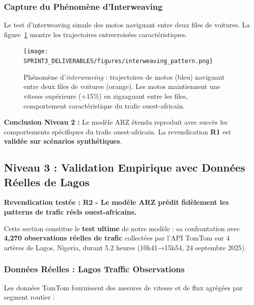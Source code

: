 \subsubsection{Capture du Phénomène d'Interweaving}
\label{subsec:validation_interweaving}

Le test d'interweaving simule des motos naviguant entre deux files de voitures. La figure~\ref{fig:interweaving_pattern} montre les trajectoires entrecroisées caractéristiques.

\begin{figure}[htbp]
    \centering
    \texttt{[image: SPRINT3\_DELIVERABLES/figures/interweaving\_pattern.png]}
    \caption{Phénomène d'\textit{interweaving} : trajectoires de motos (bleu) naviguant entre deux files de voitures (orange). Les motos maintiennent une vitesse supérieure (+15\%) en zigzaguant entre les files, comportement caractéristique du trafic ouest-africain.}
    \label{fig:interweaving_pattern}
\end{figure}

\textbf{Conclusion Niveau 2 :} Le modèle ARZ étendu reproduit avec succès les comportements spécifiques du trafic ouest-africain. La revendication \textbf{R1} est \textbf{validée sur scénarios synthétiques}.


\subsection{Niveau 3 : Validation Empirique avec Données Réelles de Lagos}
\label{sec:validation_empirique_lagos}

\textbf{Revendication testée : R2 - Le modèle ARZ prédit fidèlement les patterns de trafic réels ouest-africains.}

Cette section constitue le \textbf{test ultime} de notre modèle : sa confrontation avec \textbf{4,270 observations réelles de trafic} collectées par l'API TomTom sur 4 artères de Lagos, Nigeria, durant 5.2 heures (10h41→15h54, 24 septembre 2025).

\subsubsection{Données Réelles : Lagos Traffic Observations}
\label{subsec:lagos_data_description}

Les données TomTom fournissent des mesures de vitesse et de flux agrégées par segment routier :

